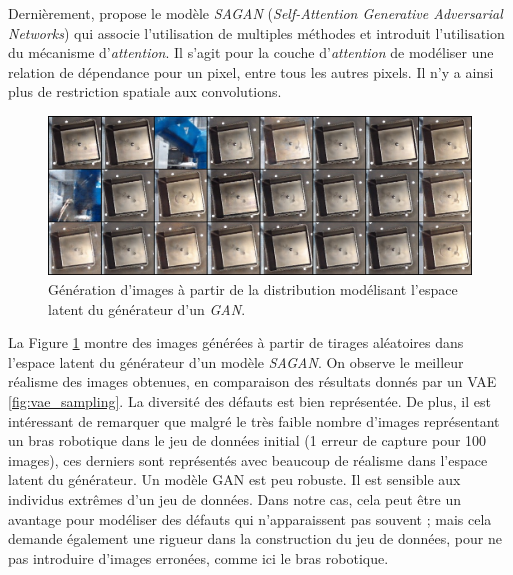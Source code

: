 Dernièrement, \citeauthor{zhang_selfattention_2018} \cite{zhang_selfattention_2018} propose le modèle \textit{SAGAN} (\textit{Self-Attention Generative Adversarial Networks}) qui associe l'utilisation de multiples méthodes et introduit l'utilisation du mécanisme d'\textit{attention}.
Il s'agit pour la couche d'\textit{attention} de modéliser une relation de dépendance pour un pixel, entre tous les autres pixels.
Il n'y a ainsi plus de restriction spatiale aux convolutions.


\begin{figure}[hbtp]
	\centering
	\includegraphics[width=\textwidth,height=\textheight,keepaspectratio]{../Chap4/Figures/SAGAN_fake_50000.jpg}
	\caption{Génération d'images à partir de la distribution modélisant l'espace latent du générateur d'un \textit{GAN}.}
	\label{fig:gan_sampling}
\end{figure}

La Figure \ref{fig:gan_sampling} montre des images générées à partir de tirages aléatoires dans l'espace latent du générateur d'un modèle \textit{SAGAN}.
On observe le meilleur réalisme des images obtenues, en comparaison des résultats donnés par un VAE \ref{fig:vae_sampling}.
La diversité des défauts est bien représentée. De plus, il est intéressant de remarquer que malgré le très faible nombre d'images représentant un bras robotique dans le jeu de données initial (1 erreur de capture pour 100 images), ces derniers sont représentés avec beaucoup de réalisme dans l'espace latent du générateur.
Un modèle GAN est peu robuste.
Il est sensible aux individus extrêmes d'un jeu de données.
Dans notre cas, cela peut être un avantage pour modéliser des défauts qui n'apparaissent pas souvent ; mais cela demande également une rigueur dans la construction du jeu de données, pour ne pas introduire d'images erronées, comme ici le bras robotique.

